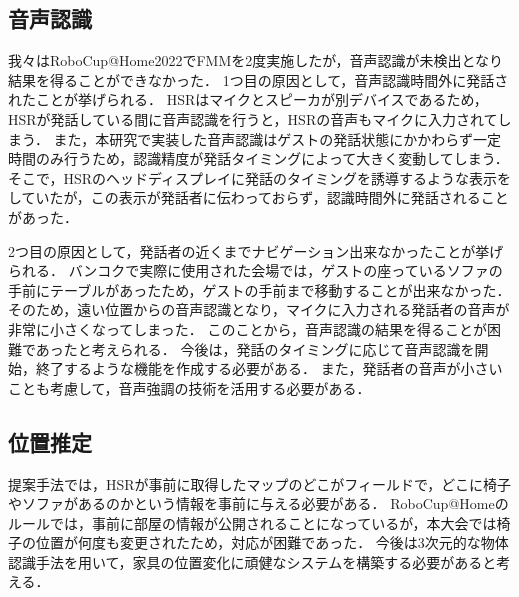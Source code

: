 \documentclass[a4j]{jarticle}
\begin{document}
\subsection{音声認識}
我々はRoboCup@Home2022でFMMを2度実施したが，音声認識が未検出となり結果を得ることができなかった．
1つ目の原因として，音声認識時間外に発話されたことが挙げられる．
HSRはマイクとスピーカが別デバイスであるため，HSRが発話している間に音声認識を行うと，HSRの音声もマイクに入力されてしまう．
また，本研究で実装した音声認識はゲストの発話状態にかかわらず一定時間のみ行うため，認識精度が発話タイミングによって大きく変動してしまう．
そこで，HSRのヘッドディスプレイに発話のタイミングを誘導するような表示をしていたが，この表示が発話者に伝わっておらず，認識時間外に発話されることがあった．

2つ目の原因として，発話者の近くまでナビゲーション出来なかったことが挙げられる．
バンコクで実際に使用された会場では，ゲストの座っているソファの手前にテーブルがあったため，ゲストの手前まで移動することが出来なかった．
そのため，遠い位置からの音声認識となり，マイクに入力される発話者の音声が非常に小さくなってしまった．
このことから，音声認識の結果を得ることが困難であったと考えられる．
今後は，発話のタイミングに応じて音声認識を開始，終了するような機能を作成する必要がある．
また，発話者の音声が小さいことも考慮して，音声強調\cite{voice_enhancement_1, voice_enhancement_2}の技術を活用する必要がある．

\subsection{位置推定}
提案手法では，HSRが事前に取得したマップのどこがフィールドで，どこに椅子やソファがあるのかという情報を事前に与える必要がある．
RoboCup@Homeのルールでは，事前に部屋の情報が公開されることになっているが，本大会では椅子の位置が何度も変更されたため，対応が困難であった．
今後は3次元的な物体認識手法\cite{sun2022onepose}を用いて，家具の位置変化に頑健なシステムを構築する必要があると考える．
\end{document}

